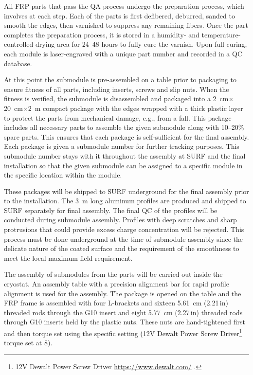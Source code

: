 All FRP parts that pass the QA process undergo the preparation process, which involves  at each step.  Each of the parts is first defibered, deburred, sanded to smooth the edges, then varnished to
suppress any remaining fibers.  Once the part completes the preparation process, it is stored in a humidity- and temperature-controlled drying area for \numrange{24}{48} hours to fully cure the varnish.  Upon full curing, each module is laser-engraved with a unique part number and recorded in a QC database. 

At this point the submodule is pre-assembled on a table prior to packaging to ensure fitness of all parts, including inserts, screws and slip nuts.   When the fitness is verified, the submodule is disassembled and packaged into a \SI{2}{\cm}$\times$\SI{20}{\cm}$\times$\SI{2}{\m} compact package with the edges wrapped with a thick plastic layer to protect the parts from mechanical damage, e.g., from a fall.  This package includes all necessary parts to assemble the given submodule 
along with \numrange{10}{20}\% spare parts.  This ensures that each package is self-sufficient for the final assembly.  Each package is given a submodule number for further tracking purposes.  This submodule number stays with it throughout the assembly at SURF and the final installation so that the given submodule can be assigned to a specific module in the specific location within the module. 

These packages will be shipped to SURF underground 
for the final assembly prior to the installation.   
The \SI{3}{\m} long aluminum profiles are produced and shipped to SURF separately for final assembly.  The final QC of the profiles will be conducted during submodule assembly.   Profiles with deep scratches and sharp protrusions that could provide excess charge concentration will be rejected. This process must be done underground at the time of submodule assembly since the delicate nature of the coated surface and the requirement of the smoothness to meet the local maximum field requirement.

The assembly of submodules from the parts will be carried out inside the cryostat.   An assembly table with a precision alignment bar for rapid profile alignment is used for the assembly.   The package is opened on the table and the FRP frame is assembled with four L-brackets and sixteen \SI{5.61}{\cm} (\num{2.21}\,in) threaded rods through the G10 insert and eight \SI{5.77}{\cm} (\num{2.27}\,in) threaded rods through G10 inserts held by the plastic nuts.  These nuts are hand-tightened first and then torque set using the specific setting (12V Dewalt Power Screw Driver\footnote{12V Dewalt\texttrademark{} Power Screw Driver \url{https://www.dewalt.com/} .} torque set at 8).


